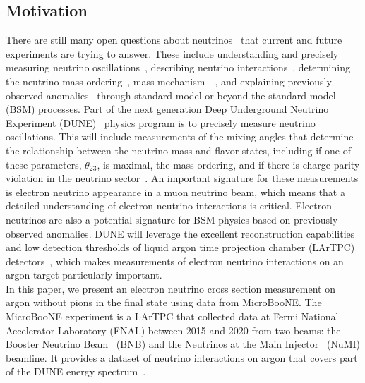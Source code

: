 \documentclass[amsmath,amssymb,aps,prd,showpacs,twocolumn,superscriptaddress,letterpaper,longbibliography, floatfix]{revtex4-2}
\begin{document}
\subsection{Motivation}
There are still many open questions about neutrinos~\cite{ATHAR2022103947} that current and future experiments are trying to answer. These include understanding and precisely measuring neutrino oscillations~\cite{ MAK62,GRI69,Giganti:2017fhf}, describing neutrino interactions~\cite{NuSTEC:2017hzk},
determining the neutrino mass ordering~\cite{massordering}, mass mechanism~\cite{massmodelsreview}~\cite{nunature},
and explaining previously observed anomalies~\cite{LSND,MiniBooNE} through standard model or beyond the standard model (BSM) processes. Part of the next generation Deep Underground Neutrino Experiment (DUNE)~\cite{DUNE_FD} physics program is to precisely measure neutrino oscillations. This will include measurements of the mixing angles that determine the relationship between the neutrino mass and flavor states, including if one of these parameters, $\theta_{23}$, is maximal, the mass ordering, and if there is charge-parity violation in the neutrino sector~\cite{LowexpDUNEsensi,LBLsensiDUNE}.  An important signature for these measurements is electron neutrino appearance in a muon neutrino beam, which means that a detailed understanding of electron neutrino interactions is critical.  Electron neutrinos are also a potential signature for BSM physics based on previously observed anomalies.  DUNE will leverage the excellent reconstruction capabilities and low detection thresholds of liquid argon time projection chamber (LArTPC) detectors~\cite{DUNE_ND,DUNE_FD}, which makes measurements of electron neutrino interactions on an argon target particularly important.\\

In this paper, we present an electron neutrino cross section measurement on argon without pions in the final state using data from MicroBooNE.  The MicroBooNE experiment is a LArTPC that collected data at Fermi National Accelerator Laboratory (FNAL) between 2015 and 2020 from two beams: the Booster Neutrino Beam~\cite{MiniBooNEFlux} (BNB) and the Neutrinos at the Main Injector~\cite{NuMIbeam} (NuMI) beamline. It provides a dataset of neutrino interactions on argon that covers part of the DUNE energy spectrum~\cite{DUNEuBfluxComp}.\\
\end{document}

